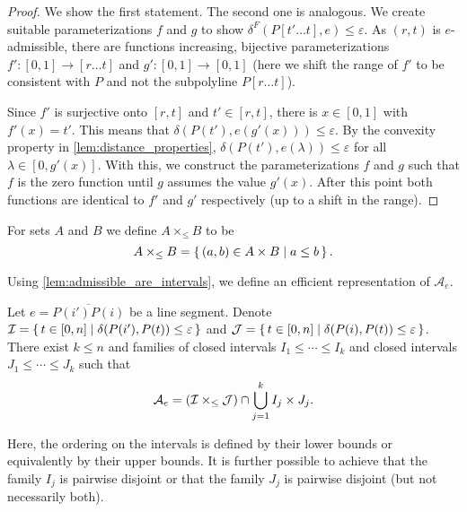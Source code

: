 \begin{proof}
	We show the first statement. The second one is analogous. We create suitable parameterizations \(f\) and \(g\) to show \(\delta^F(P[t' \dots t], e) \leq \varepsilon\). As \((r,t)\) is \(e\)-admissible, there are functions increasing, bijective parameterizations \(f':[0,1] \to [r \dots t]\) and \(g':[0,1] \to [0,1]\) (here we shift the range of \(f'\) to be consistent with \(P\) and not the subpolyline \(P[r \dots t]\)).

	Since \(f'\) is surjective onto \([r, t]\) and \(t' \in [r, t]\), there is \(x \in [0, 1]\) with \(f'(x) = t'\). This means that \(\delta(P(t'), e(g'(x))) \leq \varepsilon\). By the convexity property in \cref{lem:distance_properties}, \(\delta(P(t'), e(\lambda)) \leq \varepsilon\) for all \(\lambda \in [0, g'(x)]\). With this, we construct the parameterizations \(f\) and \(g\) such that \(f\) is the zero function until \(g\) assumes the value \(g'(x)\). After this point both functions are identical to \(f'\) and \(g'\) respectively (up to a shift in the range).
\end{proof}

\begin{definition}
	For sets \(A\) and \(B\) we define \(A \times_{\leq} B\) to be 
		\[A \times_{\leq} B = \set{(a, b) \in A \times B \mid a \leq b}.\]
\end{definition}

Using \cref{lem:admissible_are_intervals}, we define an efficient representation of \(\mathcal{A}_e\).
\begin{lemma}\label{lem:admissible-rep-1}
	Let \(e = \overline{P(i')P(i)}\) be a line segment. Denote \(\mathcal{I} = \set{t \in [0,n] \mid \delta(P(i'), P(t)) \leq \varepsilon}\) and \(\mathcal{J} = \set{t \in [0,n] \mid \delta(P(i), P(t)) \leq \varepsilon}\). There exist \(k \leq n\) and families of closed intervals \(I_1 \leq \cdots \leq I_k\) and closed intervals \(J_1 \leq \cdots \leq J_k\) such that 
	\[\mathcal{A}_e = \left(\mathcal{I} \times_\leq \mathcal{J}\right) \cap \bigcup_{j=1}^k I_j \times J_j.\]

	Here, the ordering on the intervals is defined by their lower bounds or equivalently by their upper bounds. It is further possible to achieve that the family \(I_j\) is pairwise disjoint or that the family \(J_j\) is pairwise disjoint (but not necessarily both).
\end{lemma}


